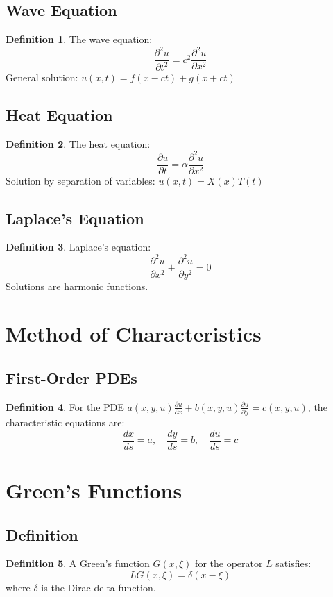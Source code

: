 \documentclass[11pt]{article}
\theoremstyle{definition}
\newtheorem{definition}{Definition}[section]
\begin{document}
\subsection{Wave Equation}
\begin{definition}
The wave equation:
$$\frac{\partial^2 u}{\partial t^2} = c^2 \frac{\partial^2 u}{\partial x^2}$$
General solution: $u(x,t) = f(x-ct) + g(x+ct)$
\end{definition}

\subsection{Heat Equation}
\begin{definition}
The heat equation:
$$\frac{\partial u}{\partial t} = \alpha \frac{\partial^2 u}{\partial x^2}$$
Solution by separation of variables: $u(x,t) = X(x)T(t)$
\end{definition}

\subsection{Laplace's Equation}
\begin{definition}
Laplace's equation:
$$\frac{\partial^2 u}{\partial x^2} + \frac{\partial^2 u}{\partial y^2} = 0$$
Solutions are harmonic functions.
\end{definition}

\section{Method of Characteristics}

\subsection{First-Order PDEs}
\begin{definition}
For the PDE $a(x,y,u) \frac{\partial u}{\partial x} + b(x,y,u) \frac{\partial u}{\partial y} = c(x,y,u)$, the characteristic equations are:
$$\frac{dx}{ds} = a, \quad \frac{dy}{ds} = b, \quad \frac{du}{ds} = c$$
\end{definition}

\section{Green's Functions}

\subsection{Definition}
\begin{definition}
A Green's function $G(x,\xi)$ for the operator $L$ satisfies:
$$LG(x,\xi) = \delta(x-\xi)$$
where $\delta$ is the Dirac delta function.
\end{definition}
\end{document}
